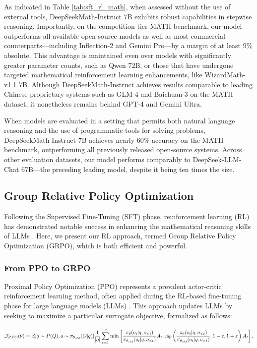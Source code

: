 \begin{itemize}[topsep=0pt]
\begin{itemize}[topsep=0pt]
As indicated in Table \ref{tab:sft_rl_math}, when assessed without the use of external tools, DeepSeekMath-Instruct 7B exhibits robust capabilities in stepwise reasoning. Importantly, on the competition-tier MATH benchmark, our model outperforms all available open-source models as well as most commercial counterparts—including Inflection-2 and Gemini Pro—by a margin of at least 9\% absolute. This advantage is maintained even over models with significantly greater parameter counts, such as Qwen 72B, or those that have undergone targeted mathematical reinforcement learning enhancements, like WizardMath-v1.1 7B. Although DeepSeekMath-Instruct achieves results comparable to leading Chinese proprietary systems such as GLM-4 and Baichuan-3 on the MATH dataset, it nonetheless remains behind GPT-4 and Gemini Ultra.

When models are evaluated in a setting that permits both natural language reasoning and the use of programmatic tools for solving problems, DeepSeekMath-Instruct 7B achieves nearly 60\% accuracy on the MATH benchmark, outperforming all previously released open-source systems. Across other evaluation datasets, our model performs comparably to DeepSeek-LLM-Chat 67B—the preceding leading model, despite it being ten times the size.

\subsection{Group Relative Policy Optimization} Following the Supervised Fine-Tuning (SFT) phase, reinforcement learning (RL) has demonstrated notable success in enhancing the mathematical reasoning skills of LLMs \citep{wang2023math,wizardmath}. Here, we present our RL approach, termed Group Relative Policy Optimization (GRPO), which is both efficient and powerful.

\subsubsection{From PPO to GRPO} Proximal Policy Optimization (PPO) \citep{schulman2017proximal} represents a prevalent actor-critic reinforcement learning method, often applied during the RL-based fine-tuning phase for large language models (LLMs) \citep{ouyang2022training}. This approach updates LLMs by seeking to maximize a particular surrogate objective, formalized as follows:

\begin{equation}
\footnotesize
    \mathcal{J}_{PPO}(\theta) = \mathbb{E}{[q \sim P(Q), o \sim \pi_{\theta_{old}}(O|q)]} \frac{1}{|o|} \sum_{t=1}^{|o|} \min \left[ \frac{\pi_\theta(o_{t} | q, o_{<t})}{\pi_{\theta_{old}}(o_{t} | q, o_{<t})} A_{t}, \text{clip} \left( \frac{\pi_\theta(o_{t} | q, o_{<t})}{\pi_{\theta_{old}}(o_{t} | q, o_{<t})}, 1 - \varepsilon, 1 + \varepsilon \right)  A_{t} \right] ,
\end{equation}


\end{itemize}
\end{itemize}
